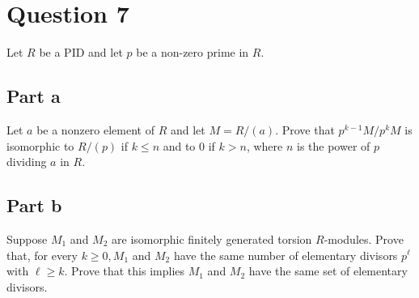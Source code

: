 \section{Question 7}

\begin{question}
    Let $R$ be a PID and let $p$ be a non-zero prime in $R$.
\end{question}

\subsection{Part a}

\begin{question}
    Let $a$ be a nonzero element of $R$ and let $M=R /(a)$. Prove that $p^{k-1} M / p^k M$ is isomorphic to $R /(p)$ if $k \leq n$ and to 0 if $k>n$, where $n$ is the power of $p$ dividing $a$ in $R$.
\end{question}

\begin{answer}
    
\end{answer}

\subsection{Part b}

\begin{question}
    Suppose $M_1$ and $M_2$ are isomorphic finitely generated torsion $R$-modules. Prove that, for every $k \geq 0, M_1$ and $M_2$ have the same number of elementary divisors $p^{\ell}$ with $\ell \geq k$. Prove that this implies $M_1$ and $M_2$ have the same set of elementary divisors.
\end{question}

\begin{answer}
    
\end{answer}